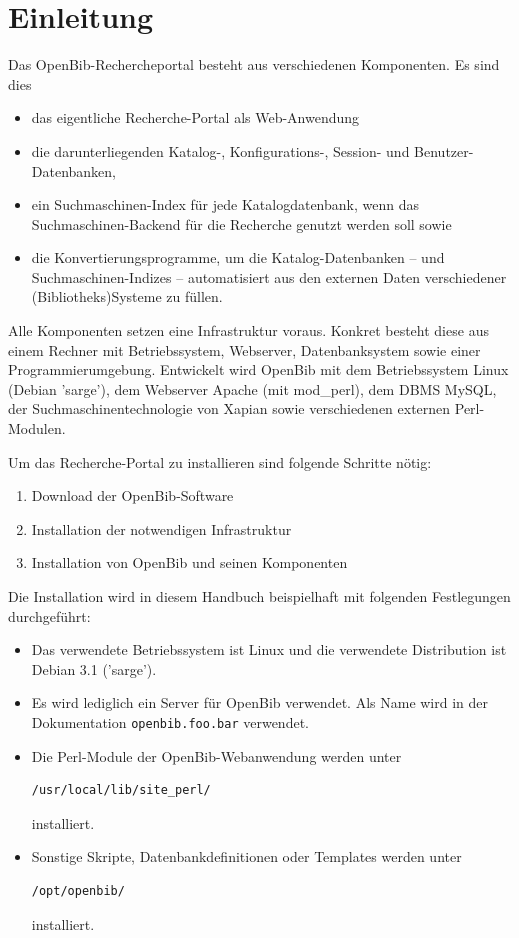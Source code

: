 \documentclass[11pt, twoside, a4paper, BCOR8mm, DIV12, bibtotoc,idxtotoc]{scrbook}
\begin{document}
\mainmatter

\chapter{Einleitung}

Das OpenBib-Rechercheportal besteht aus verschiedenen Komponenten. Es
sind dies

\begin{itemize}
\item das eigentliche Recherche-Portal als Web-Anwendung
\item die darunterliegenden Katalog-, Konfigurations-, Session- und
  Benutzer-Datenbanken,
\item ein Suchmaschinen-Index für jede Katalogdatenbank, wenn das
  Suchmaschinen-Backend für die Recherche genutzt werden soll sowie
\item die Konvertierungsprogramme, um die Katalog-Datenbanken -- und
  Suchmaschinen-Indizes -- automatisiert aus den externen Daten
  verschiedener (Bibliotheks)Systeme zu füllen.
\end{itemize}

Alle Komponenten setzen eine Infrastruktur voraus. Konkret besteht
diese aus einem Rechner mit Betriebssystem, Webserver, Datenbanksystem
sowie einer Programmierumgebung. Entwickelt wird OpenBib mit dem
Betriebssystem Linux (Debian 'sarge'), dem Webserver Apache (mit
mod\_perl), dem DBMS MySQL, der Suchmaschinentechnologie von Xapian
sowie verschiedenen externen Perl-Modulen.

Um das Recherche-Portal zu installieren sind folgende Schritte nötig:
\begin{enumerate}
\item Download der OpenBib-Software
\item Installation der notwendigen Infrastruktur
\item Installation von OpenBib und seinen Komponenten
\end{enumerate}

Die Installation wird in diesem Handbuch beispielhaft mit folgenden
Festlegungen durchgeführt:

\begin{itemize}
\item Das verwendete Betriebssystem ist Linux und die verwendete
  Distribution ist Debian 3.1 ('sarge').
\item Es wird lediglich ein Server für OpenBib verwendet. Als Name
  wird in der Dokumentation \texttt{openbib.foo.bar} verwendet.
\item Die Perl-Module der OpenBib-Webanwendung werden unter
\begin{verbatim}
/usr/local/lib/site_perl/
\end{verbatim}
  installiert.
\item Sonstige Skripte, Datenbankdefinitionen oder Templates werden
  unter
\begin{verbatim}
/opt/openbib/
\end{verbatim}
  installiert.
\end{itemize}
\end{document}
